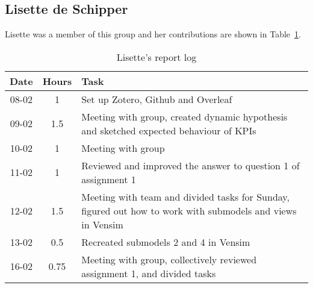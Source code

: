 \subsection{Lisette de Schipper}
Lisette was a member of this group and her contributions are shown in Table~\ref{tab:lisette_log}. 
\begin{longtable}[c]{c|c|m{35em}}
\caption{Lisette's report log}
\label{tab:lisette_log}\\
\textbf{Date}& \textbf{Hours} & \textbf{Task} \\
\hline
\endfirsthead
%
\endhead
%
08-02 & 1 & Set up Zotero, Github and Overleaf \\
09-02 & 1.5 & Meeting with group, created dynamic hypothesis and sketched expected behaviour of KPIs\\
10-02 & 1 & Meeting with group \\
11-02 & 1 & Reviewed and improved the answer to question 1 of assignment 1 \\
12-02 & 1.5 & Meeting with team and divided tasks for Sunday, figured out how to work with submodels and views in Vensim \\
13-02 & 0.5 & Recreated submodels 2 and 4 in Vensim \\
16-02 & 0.75 & Meeting with group, collectively reviewed assignment 1, and divided tasks \\
\end{longtable}